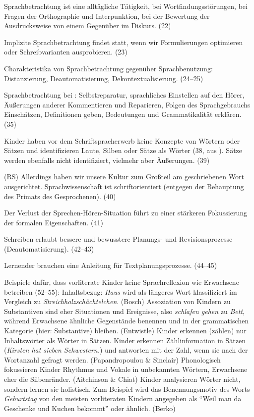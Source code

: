 Sprachbetrachtung ist eine alltägliche Tätigkeit, \zB bei Wortfindungsstörungen, bei Fragen der Orthographie und Interpunktion, bei der Bewertung der Ausdrucksweise von einem Gegenüber im Diskurs. (22)

Implizite Sprachbetrachtung findet statt, wenn wir \zB Formulierungen optimieren oder Schreibvarianten ausprobieren. (23)

Charakteristika von Sprachbetrachtung gegenüber Sprachbenutzung: Distanzierung, Deautomatisierung, Dekontextualisierung. (24--25)

Sprachbetrachtung bei \citet{Clark1978}: Selbstreparatur, sprachliches Einstellen auf den Hörer, Äußerungen anderer Kommentieren und Reparieren, Folgen des Sprachgebrauchs Einschätzen, Definitionen geben, Bedeutungen und Grammatikalität erklären. (35)

Kinder haben vor dem Schriftspracherwerb keine Konzepte von Wörtern oder Sätzen und identifizieren Laute, Silben oder Sätze als Wörter (38, aus \citealt{SteinigHuneke2002}).
Sätze werden ebenfalls nicht identifiziert, vielmehr aber Äußerungen. (39)

(RS) Allerdings haben wir unsere Kultur zum Großteil am geschriebenen Wort ausgerichtet.
Sprachwissenschaft ist schriftorientiert (entgegen der Behauptung des Primats des Gesprochenen). (40)

Der Verlust der Sprechen-Hören-Situation führt zu einer stärkeren Fokussierung der formalen Eigenschaften. (41)

Schreiben erlaubt bessere und bewusstere Planungs- und Revisionsprozesse (Deautomatisierung). (42--43)

Lernender brauchen eine Anleitung für Textplanungsprozesse. (44--45)

Beispiele dafür, dass vorliterate Kinder keine Sprachreflexion wie Erwachsene betreiben (52--55):
Inhaltsbezug: \textit{Haus} wird als längeres Wort klassifiziert im Vergleich zu \textit{Streichholzschächtelchen}. (Bosch)
Assoziation von Kindern zu Substantiven sind eher Situationen und Ereignisse, also \textit{schlafen gehen} zu \textit{Bett}, während Erwachsene ähnliche Gegenstände benennen und in der grammatischen Kategorie (hier: Substantive) bleiben. (Entwistle)
Kinder erkennen (zählen) nur Inhaltswörter als Wörter in Sätzen.
Kinder erkennen Zählinformation in Sätzen (\textit{Kirsten hat sieben Schwestern.}) und antworten mit der Zahl, wenn sie nach der Wortanzahl gefragt werden. (Papandropoulou \& Sinclair)
Phonologisch fokussieren Kinder Rhythmus und Vokale in unbekannten Wörtern, Erwachsene eher die Silbenränder. (Aitchinson \& Chiat)
Kinder analysieren Wörter nicht, sondern lernen sie holistisch. Zum Beispiel wird das Benennungsmotiv des Worts \textit{Geburtstag} von den meisten vorliteraten Kindern angegeben als "`Weil man da Geschenke und Kuchen bekommt"' oder ähnlich. (Berko)

